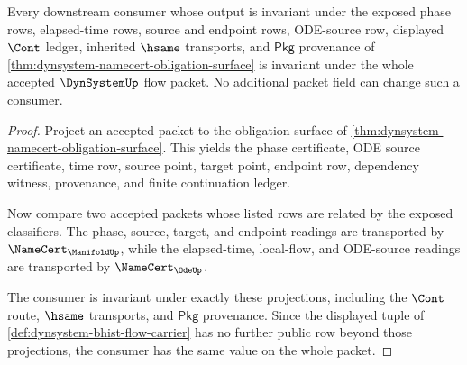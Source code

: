 \begin{theorem}
\label{thm:dynsystem-flow-consumer-projection-coverage}
Every downstream consumer whose output is invariant under the exposed phase rows, elapsed-time rows, source and endpoint rows, ODE-source row, displayed $\Cont$ ledger, inherited $\hsame$ transports, and $\mathsf{Pkg}$ provenance of \autoref{thm:dynsystem-namecert-obligation-surface} is invariant under the whole accepted $\DynSystemUp$ flow packet. No additional packet field can change such a consumer.
\end{theorem}
\begin{proof}
Project an accepted packet to the obligation surface of \autoref{thm:dynsystem-namecert-obligation-surface}. This yields the phase certificate, ODE source certificate, time row, source point, target point, endpoint row, dependency witness, provenance, and finite continuation ledger.

Now compare two accepted packets whose listed rows are related by the exposed classifiers. The phase, source, target, and endpoint readings are transported by $\NameCert_{\ManifoldUp}$, while the elapsed-time, local-flow, and ODE-source readings are transported by $\NameCert_{\OdeUp}$.

The consumer is invariant under exactly these projections, including the $\Cont$ route, $\hsame$ transports, and $\mathsf{Pkg}$ provenance. Since the displayed tuple of \autoref{def:dynsystem-bhist-flow-carrier} has no further public row beyond those projections, the consumer has the same value on the whole packet.
\end{proof}

